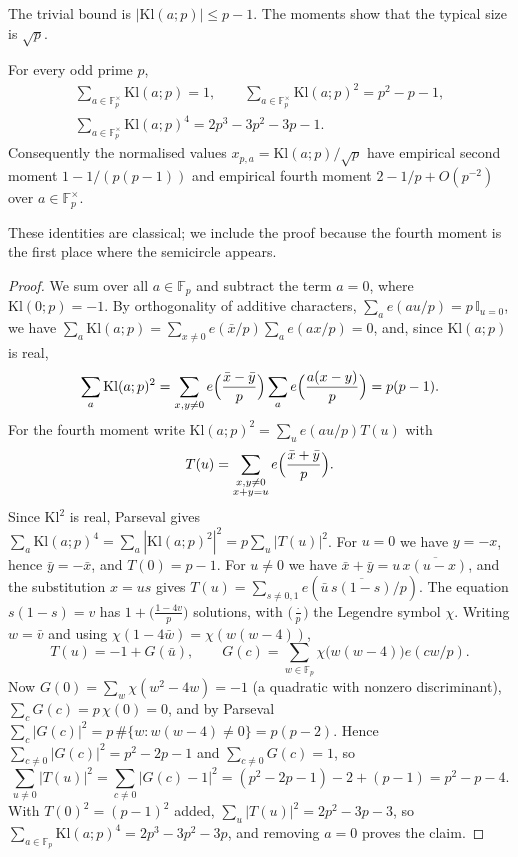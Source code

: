 The trivial bound is $|\mathrm{Kl}(a;p)|\le p-1$. The moments show that the typical size is $\sqrt p$.

\begin{proposition}\label{prop:06bmoments}
For every odd prime $p$,
\begin{gather*}
\sum_{a\in\mathbb{F}_p^\times}\mathrm{Kl}(a;p)=1,\qquad
\sum_{a\in\mathbb{F}_p^\times}\mathrm{Kl}(a;p)^2=p^2-p-1,\\
\sum_{a\in\mathbb{F}_p^\times}\mathrm{Kl}(a;p)^4=2p^3-3p^2-3p-1 .
\end{gather*}
Consequently the normalised values $x_{p,a}=\mathrm{Kl}(a;p)/\sqrt p$ have empirical second moment $1-1/(p(p-1))$ and empirical fourth moment $2-1/p+O(p^{-2})$ over $a\in\mathbb{F}_p^\times$.
\end{proposition}

These identities are classical; we include the proof because the fourth moment is the first place where the semicircle appears.

\begin{proof}
We sum over all $a\in\mathbb{F}_p$ and subtract the term $a=0$, where $\mathrm{Kl}(0;p)=-1$. By orthogonality of additive characters, $\sum_ae(au/p)=p\,\mathbb{I}_{u=0}$, we have $\sum_a\mathrm{Kl}(a;p)=\sum_{x\ne0}e(\bar x/p)\sum_ae(ax/p)=0$, and, since $\mathrm{Kl}(a;p)$ is real,
\[
\sum_a\mathrm{Kl}(a;p)^2=\sum_{x,y\ne0}e\Bigl(\frac{\bar x-\bar y}{p}\Bigr)\sum_ae\Bigl(\frac{a(x-y)}{p}\Bigr)=p(p-1).
\]
For the fourth moment write $\mathrm{Kl}(a;p)^2=\sum_{u}e(au/p)T(u)$ with
\[
T(u)=\sum_{\substack{x,y\ne0\\ x+y=u}}e\Bigl(\frac{\bar x+\bar y}{p}\Bigr).
\]
Since $\mathrm{Kl}^2$ is real, Parseval gives $\sum_a\mathrm{Kl}(a;p)^4=\sum_a|\mathrm{Kl}(a;p)^2|^2=p\sum_u|T(u)|^2$. For $u=0$ we have $y=-x$, hence $\bar y=-\bar x$, and $T(0)=p-1$. For $u\ne0$ we have $\bar x+\bar y=u\,\overline{x(u-x)}$, and the substitution $x=us$ gives $T(u)=\sum_{s\ne0,1}e(\bar u\,\overline{s(1-s)}/p)$. The equation $s(1-s)=v$ has $1+\bigl(\frac{1-4v}{p}\bigr)$ solutions, with $\bigl(\frac{\cdot}{p}\bigr)$ the Legendre symbol $\chi$. Writing $w=\bar v$ and using $\chi(1-4\bar w)=\chi(w(w-4))$,
\[
T(u)=-1+G(\bar u),\qquad G(c)=\sum_{w\in\mathbb{F}_p}\chi\bigl(w(w-4)\bigr)e(cw/p).
\]
Now $G(0)=\sum_w\chi(w^2-4w)=-1$ (a quadratic with nonzero discriminant), $\sum_cG(c)=p\,\chi(0)=0$, and by Parseval $\sum_c|G(c)|^2=p\,\#\{w:w(w-4)\ne0\}=p(p-2)$. Hence $\sum_{c\ne0}|G(c)|^2=p^2-2p-1$ and $\sum_{c\ne0}G(c)=1$, so
\[
\sum_{u\ne0}|T(u)|^2=\sum_{c\ne0}|G(c)-1|^2=(p^2-2p-1)-2+(p-1)=p^2-p-4 .
\]
With $T(0)^2=(p-1)^2$ added, $\sum_u|T(u)|^2=2p^2-3p-3$, so $\sum_{a\in\mathbb{F}_p}\mathrm{Kl}(a;p)^4=2p^3-3p^2-3p$, and removing $a=0$ proves the claim.
\end{proof}

